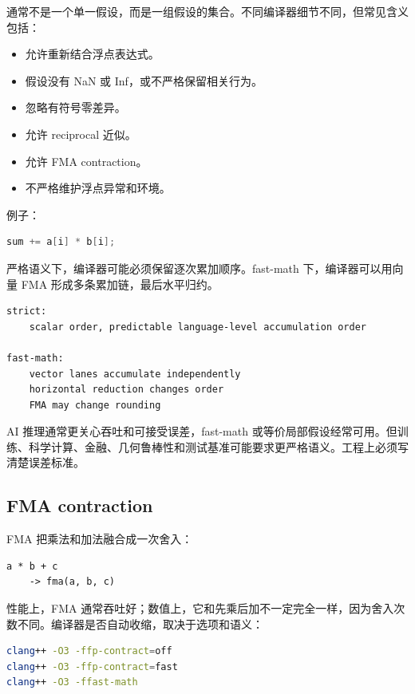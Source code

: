  通常不是一个单一假设，而是一组假设的集合。不同编译器细节不同，但常见含义包括：

\begin{itemize}
  \item 允许重新结合浮点表达式。
  \item 假设没有 NaN 或 Inf，或不严格保留相关行为。
  \item 忽略有符号零差异。
  \item 允许 reciprocal 近似。
  \item 允许 FMA contraction。
  \item 不严格维护浮点异常和环境。
\end{itemize}

例子：

\begin{lstlisting}[language=C++]
sum += a[i] * b[i];
\end{lstlisting}

严格语义下，编译器可能必须保留逐次累加顺序。fast-math 下，编译器可以用向量 FMA 形成多条累加链，最后水平归约。

\begin{lstlisting}
strict:
    scalar order, predictable language-level accumulation order

fast-math:
    vector lanes accumulate independently
    horizontal reduction changes order
    FMA may change rounding
\end{lstlisting}

AI 推理通常更关心吞吐和可接受误差，fast-math 或等价局部假设经常可用。但训练、科学计算、金融、几何鲁棒性和测试基准可能要求更严格语义。工程上必须写清楚误差标准。

\subsection{FMA contraction}

FMA 把乘法和加法融合成一次舍入：

\begin{lstlisting}
a * b + c
    -> fma(a, b, c)
\end{lstlisting}

性能上，FMA 通常吞吐好；数值上，它和先乘后加不一定完全一样，因为舍入次数不同。编译器是否自动收缩，取决于选项和语义：

\begin{lstlisting}[language=bash]
clang++ -O3 -ffp-contract=off
clang++ -O3 -ffp-contract=fast
clang++ -O3 -ffast-math
\end{lstlisting}

